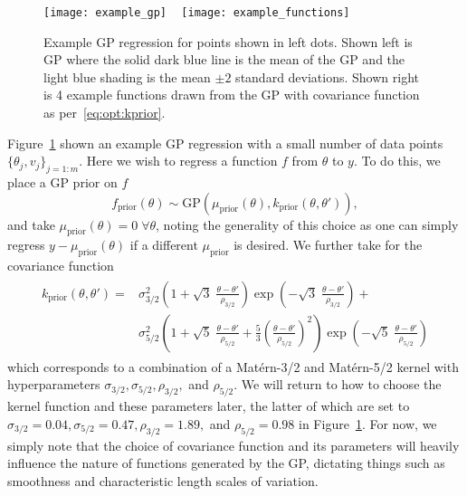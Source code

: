 \begin{figure}[t]
	\texttt{[image: example\_gp]}
		~
	\texttt{[image: example\_functions]}
	\caption{Example GP regression for points shown in left dots.  Shown left is GP where
		the solid dark blue line is the mean of the GP and the light blue shading is the
		mean $\pm2$ standard deviations.  Shown right is 4 example functions drawn
		from the GP with covariance function as per~\eqref{eq:opt:kprior}.\label{fig:opt:example_gp}}
\end{figure}

Figure~\ref{fig:opt:example_gp} shown an example GP regression with a small
number of data points $\{\theta_j,{v}_j\}_{j=1:m}$.  Here we wish to regress a function $f$ 
from $\theta$ to $y$.  To do this, we place a GP prior on $f$
\[
f_{\text{prior}} (\theta) \sim \text{GP}\left(\mu_{\text{prior}} (\theta),k_{\text{prior}}(\theta,\theta')\right),
\]
and take $\mu_{\text{prior}} (\theta) = 0 \; \forall \theta$, noting the
generality of this choice as one can simply regress $y-\mu_{\text{prior}}(\theta)$ if
a different $\mu_{\text{prior}}$ is desired.  We further take for the covariance function
\begin{align}
\label{eq:opt:kprior}
\begin{split}
k_{\text{prior}}\left(\theta,\theta'\right) = & \sigma_{3/2}^2 \left(1+\sqrt{3} \; \frac{\theta-\theta'}{\rho_{3/2}}\right)\exp\left(-\sqrt{3} \;\frac{\theta-\theta'}{\rho_{3/2}}\right) +\\&\sigma_{5/2}^2 \left(1+\sqrt{5}\;\frac{\theta-\theta'}{\rho_{5/2}}+\frac{5}{3}\left(\frac{\theta-\theta'}{\rho_{5/2}}\right)^2\right)\exp\left(-\sqrt{5}\;\frac{\theta-\theta'}{\rho_{5/2}}\right)
\end{split}
\end{align}
which corresponds to a combination of a Mat\'{e}rn-3/2 and Mat\'{e}rn-5/2
kernel with hyperparameters $\sigma_{3/2}, \sigma_{5/2}, \rho_{3/2},$ and
$\rho_{5/2}$.  We will return to how to choose the kernel function and
these parameters later, the latter of which are set to
$\sigma_{3/2}=0.04, \sigma_{5/2}=0.47, \rho_{3/2}=1.89,$ and
$\rho_{5/2}=0.98$ in Figure~\ref{fig:opt:example_gp}.  For now, we simply note
that the choice of covariance function and its parameters will heavily influence 
the nature of functions generated by the GP, dictating things such as smoothness 
and characteristic length scales of variation.

